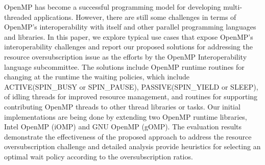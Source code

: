 OpenMP has become a successful programming model
for developing multi-threaded applications.
However, there are still some challenges in terms of OpenMP's interoperability
with itself and other parallel programming languages and libraries.
In this paper, we explore typical use cases that expose OpenMP's interoperability challenges and
report our proposed solutions for addressing the resource oversubscription issue as the efforts
by the OpenMP Interoperability language subcommittee. 
The solutions include OpenMP runtime routines for
changing at the runtime the waiting policies, which include ACTIVE(SPIN\_BUSY or SPIN\_PAUSE), 
PASSIVE(SPIN\_YIELD or SLEEP), 
of idling threads for improved resource management, and 
routines for supporting contributing OpenMP threads to other thread libraries or tasks. 
Our initial implementations are being done by extending two OpenMP runtime libraries, 
Intel OpenMP (iOMP) and GNU OpenMP (gOMP).
The evaluation results demonstrate the effectiveness of the proposed approach to address the resource 
oversubscription challenge and detailed analysis provide heuristics for selecting an optimal wait policy according
to the oversubscription ratios. 


